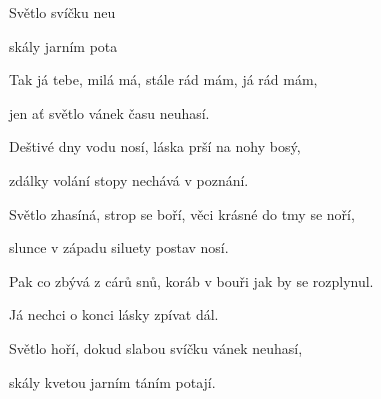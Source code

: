 

\zs
Světlo   svíčku  neu

skály  jarním  pota 

Tak já tebe, milá má, stále rád mám, já rád mám,

jen ať světlo vánek času neuhasí.
\ks

\zr
Deštivé dny vodu nosí, láska prší na nohy bosý,

zdálky volání stopy nechává v poznání.

Světlo zhasíná, strop se boří, věci krásné do tmy se noří,

slunce v západu siluety postav nosí.
\kr

\zs
Pak co zbývá z cárů snů, koráb v bouři jak by se rozplynul.

Já nechci o konci lásky zpívat dál.

Světlo hoří, dokud slabou svíčku vánek neuhasí,

skály kvetou jarním táním potají.
\ks

\zr\kr

\kp
